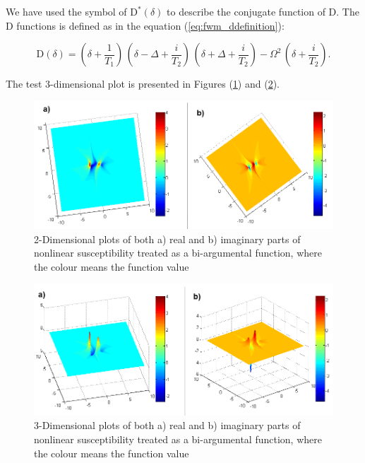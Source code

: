 \documentclass[12pt,twoside,a4paper]{article}
\numberwithin{equation}{subsection}
\numberwithin{figure}{subsection}
\begin{document}
We have used the symbol of ${\mathrm{D}^{*}}(\delta )$ to describe the conjugate function of D. The D functions is defined as in the equation (\ref{eq:fwm_ddefinition}):


\begin{equation} \label{eq:fwm_ddefinition}
  \mathrm{D}(\delta)=(\delta + \frac {1}{{T_{1}}}) \, (\delta - \Delta  + \frac {i}{{T_{2}}})
   \,(\delta  + \Delta  + \frac {i}{{T_{2}}}) - \Omega ^{2}\,(\delta + \frac {i}{{T_{2}}}).
\end{equation}

The test 3-dimensional plot is presented in Figures (\ref{fig:fmix_2d}) and (\ref{fig:fmix_3d}).

\begin{figure}
	\begin{center} 
		\includegraphics[width=150mm]{img/fmix_2d.png}
		\caption{2-Dimensional plots of both a) real and b) imaginary parts of nonlinear susceptibility treated as a bi-argumental function, where the colour means the function value \label{fig:fmix_2d}}
	\end{center}
\end{figure}

\begin{figure}
	\begin{center}
		\includegraphics[width=150mm]{img/fmix_3d.png}
		\caption{3-Dimensional plots of both a) real and b) imaginary parts of nonlinear susceptibility treated as a bi-argumental function, where the colour means the function value \label{fig:fmix_3d}}
	\end{center} 
\end{figure}
\end{document}
